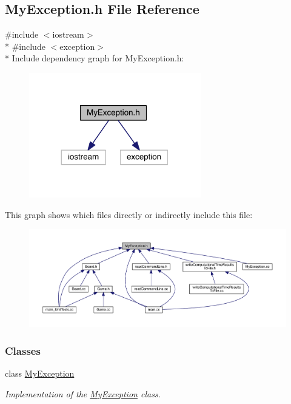 \hypertarget{a00111}{}\subsection{My\+Exception.\+h File Reference}
\label{a00111}
{\ttfamily \#include $<$iostream$>$}\\*
{\ttfamily \#include $<$exception$>$}\\*
Include dependency graph for My\+Exception.\+h\+:\nopagebreak
\begin{figure}[H]
\begin{center}
\leavevmode
\includegraphics[width=212pt]{a00146}
\end{center}
\end{figure}
This graph shows which files directly or indirectly include this file\+:\nopagebreak
\begin{figure}[H]
\begin{center}
\leavevmode
\includegraphics[width=350pt]{a00147}
\end{center}
\end{figure}
\subsubsection*{Classes}
\begin{DoxyCompactItemize}
\item 
class \hyperlink{a00052}{My\+Exception}
\begin{DoxyCompactList}\small\item\em Implementation of the \hyperlink{a00052}{My\+Exception} class. \end{DoxyCompactList}\end{DoxyCompactItemize}
